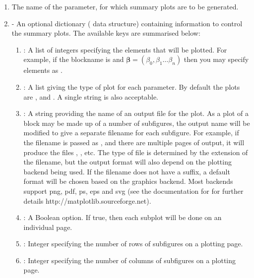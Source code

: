 \documentclass[article]{jss}
\begin{document}
  \begin{enumerate}
  \item {} The name of the parameter, for which summary
    plots are to be generated.
  \item {} - An optional dictionary
    ( data structure) containing information to
    control the summary plots.  The available keys are summarised
    below:

    \begin{enumerate}
    \item {}: A list of integers specifying the elements
      that will be plotted. For example, if the blockname is
       and
      $\bm{\beta}=(\beta_{0},\beta_{1}\ldots\beta_{n})$ then you may
      specify elements as .
    \item {}: A list giving the type of plot for each
      parameter. By default the plots are ,
       and . A single string is also
      acceptable.
    \item {}: A string providing the name of an output
      file for the plot.  As a plot of a block may be made up of a
      number of subfigures, the output name will be modified to give a
      separate filename for each subfigure. For example, if the
      filename is passed as , and there are multiple
      pages of output, it will produce the files ,
      , etc.  The type of file is determined by the
      extension of the filename, but the output format will also
      depend on the plotting backend being used.  If the filename does
      not have a suffix, a default format will be chosen based on the
      graphics backend. Most backends support png, pdf, ps, eps and
      svg (see the documentation for  for further
      details http://matplotlib.sourceforge.net).

    \item {}: A Boolean option. If true, then each
      subplot will be done on an individual page.
    \item {}: Integer specifying the number of rows of
      subfigures on a plotting page.
    \item {}: Integer specifying the number of columns of
      subfigures on a plotting page.
    \end{enumerate}


\end{enumerate}
\end{document}
